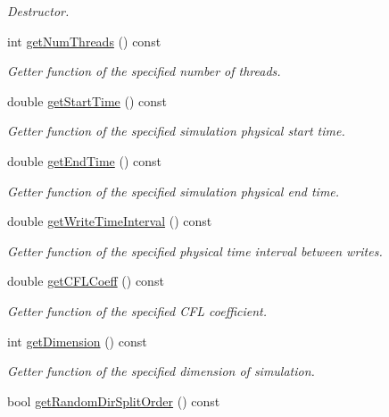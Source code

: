 \begin{DoxyCompactItemize}
\begin{DoxyCompactList}\small\item\em Destructor. \end{DoxyCompactList}\item 
int \hyperlink{classInitializer_a4dcf0bde88ac4546d5bd514ccee9edd9}{get\-Num\-Threads} () const 
\begin{DoxyCompactList}\small\item\em Getter function of the specified number of threads. \end{DoxyCompactList}\item 
double \hyperlink{classInitializer_a9ceaeef9151ef04eec9869d87ef72fc9}{get\-Start\-Time} () const 
\begin{DoxyCompactList}\small\item\em Getter function of the specified simulation physical start time. \end{DoxyCompactList}\item 
double \hyperlink{classInitializer_a1ae812ddd69f72689ed6d09c86d9aeb7}{get\-End\-Time} () const 
\begin{DoxyCompactList}\small\item\em Getter function of the specified simulation physical end time. \end{DoxyCompactList}\item 
double \hyperlink{classInitializer_acae2ad876640dcf42d52ebe7d0ca3603}{get\-Write\-Time\-Interval} () const 
\begin{DoxyCompactList}\small\item\em Getter function of the specified physical time interval between writes. \end{DoxyCompactList}\item 
double \hyperlink{classInitializer_a8a279957aac13e582142bc90701e873d}{get\-C\-F\-L\-Coeff} () const 
\begin{DoxyCompactList}\small\item\em Getter function of the specified C\-F\-L coefficient. \end{DoxyCompactList}\item 
int \hyperlink{classInitializer_ad336449c8ae4f0866aaed2b6ecb8b47b}{get\-Dimension} () const 
\begin{DoxyCompactList}\small\item\em Getter function of the specified dimension of simulation. \end{DoxyCompactList}\item 
bool \hyperlink{classInitializer_a93eb0679fd63b07cf0774875b96d66e9}{get\-Random\-Dir\-Split\-Order} () const 

\end{DoxyCompactItemize}
